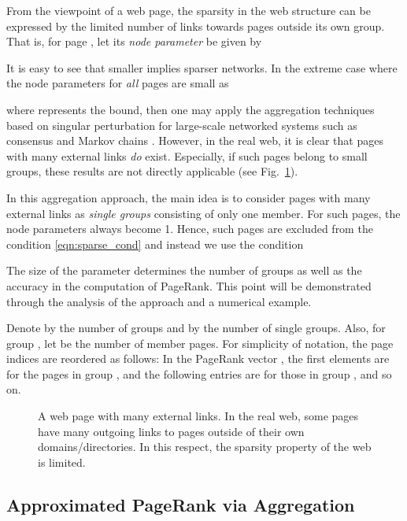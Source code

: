 \documentclass[11pt,draftcls,onecolumn]{IEEEtran}
\begin{document}
From the viewpoint of a web page, the sparsity in the web structure can be
expressed by the limited number of links towards pages outside its own group.
That is, for page , let its \textit{node parameter}  be given by

It is easy to see that smaller  implies sparser networks. 
In the extreme case where the node parameters for \textit{all} pages are small as

where  represents the bound, 
then one may apply the aggregation techniques based on singular perturbation
for large-scale networked systems such as consensus and Markov chains
\cite{PhiKok:81,AldKha:91,BiyArc:08,ChoKok:85}.
However, in the real web, it is clear that pages with many external links
\textit{do} exist. Especially, if such pages belong to small groups, 
these results are not directly applicable (see Fig.~\ref{fig:aggregation2}).

In this aggregation approach, the main idea is to consider pages with many external links as
\textit{single groups} consisting of only one member. For such pages, the node parameters
always become 1.  Hence, such pages are excluded from the condition 
\eqref{eqn:sparse_cond} and instead we use the condition

The size of the parameter  determines the number of groups
as well as the accuracy in the computation of PageRank. This point will
be demonstrated through the analysis of the approach and a numerical example. 

Denote by  the number of groups and by  the number of single groups. 
Also, for group , let  be the number of member pages. 
For simplicity of notation, the page indices are reordered as follows:
In the PageRank vector , the first  
elements are for the pages in group , and the following  entries are 
for those in group , and so on.

\begin{figure}
  \centering
  \caption{A web page with many external links. In the real web, some pages have many
    outgoing links to pages outside of their own domains/directories. 
    In this respect, the sparsity property of the web is limited.}
  \label{fig:aggregation2}  
\end{figure}





\subsection*{Approximated PageRank via Aggregation}
\end{document}
